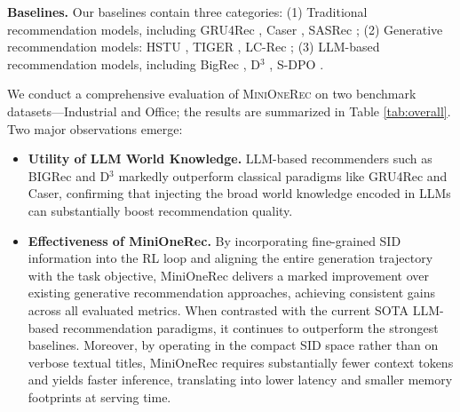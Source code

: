 \textbf{Baselines.} 
Our baselines contain three categories: (1) Traditional recommendation models, including GRU4Rec \citep{GRU4Rec}, Caser \citep{Caser}, SASRec \citep{SASRec}; (2) Generative recommendation models: HSTU \citep{HSTU}, TIGER \citep{TIGER}, LC-Rec \citep{LCRec}; (3) LLM-based recommendation models, including BigRec \citep{BIGRec}, D$^3$ \citep{D3}, S-DPO \citep{sdpo}.

We conduct a comprehensive evaluation of \textsc{MiniOneRec} on two benchmark datasets—Industrial and Office; the results are summarized in Table \ref{tab:overall}. 
Two major observations emerge:

\begin{itemize}[leftmargin=*]
    \item \textbf{Utility of LLM World Knowledge.} LLM-based recommenders such as BIGRec and D$^3$ markedly outperform classical paradigms like GRU4Rec and Caser, confirming that injecting the broad world knowledge encoded in LLMs can substantially boost recommendation quality.
    \item \textbf{Effectiveness of MiniOneRec.} By incorporating fine-grained SID information into the RL loop and aligning the entire generation trajectory with the task objective, MiniOneRec delivers a marked improvement over existing generative recommendation approaches, achieving consistent gains across all evaluated metrics. When contrasted with the current SOTA LLM-based recommendation paradigms, it continues to outperform the strongest baselines. Moreover, by operating in the compact SID space rather than on verbose textual titles, MiniOneRec requires substantially fewer context tokens and yields faster inference, translating into lower latency and smaller memory footprints at serving time.
\end{itemize}

